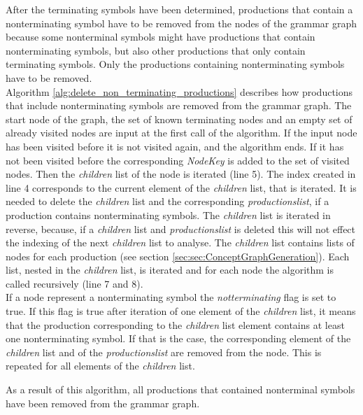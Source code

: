After the terminating symbols have been determined, productions that contain a nonterminating symbol have to be removed from the nodes of the grammar graph because some nonterminal symbols might have productions that contain nonterminating symbols, but also other productions that only contain terminating symbols. Only the productions containing nonterminating symbols have to be removed.\\
Algorithm \ref{alg:delete_non_terminating_productions}  describes how productions that include nonterminating symbols are removed from the grammar graph.
The start node of the graph, the set of known terminating nodes and an empty set of already visited nodes are input at the first call of the algorithm.
If the input node has been visited before it is not visited again, and the algorithm ends.
If it has not been visited before the corresponding \textit{Node\textunderscore Key} is added to the set of visited nodes.
Then the \textit{children} list of the node is iterated (line 5).
The index created in line 4 corresponds to the current element of the \textit{children} list, that is iterated.
It is needed to delete the \textit{children} list and the corresponding \textit{productions\textunderscore list}, if a production contains nonterminating symbols. The \textit{children} list is iterated in reverse, because, if a \textit{children} list and \textit{productions\textunderscore list} is deleted this will not effect the indexing of the next \textit{children} list to analyse.
The \textit{children} list contains lists of nodes for each production (see section \ref{sec:sec:ConceptGraphGeneration}). Each list, nested in the \textit{children} list, is iterated and for each node the algorithm is called recursively (line 7 and 8).\\
If a node represent a nonterminating symbol the \textit{not\textunderscore terminating} flag is set to true.
If this flag is true after iteration of one element of the \textit{children} list, it means that the production corresponding to the \textit{children} list element contains at least one nonterminating symbol.
If that is the case, the corresponding element of the \textit{children} list and of the \textit{productions\textunderscore list} are removed from the node.
This is repeated for all elements of the \textit{children} list.

As a result of this algorithm, all productions that contained nonterminal symbols have been removed from the grammar graph.

